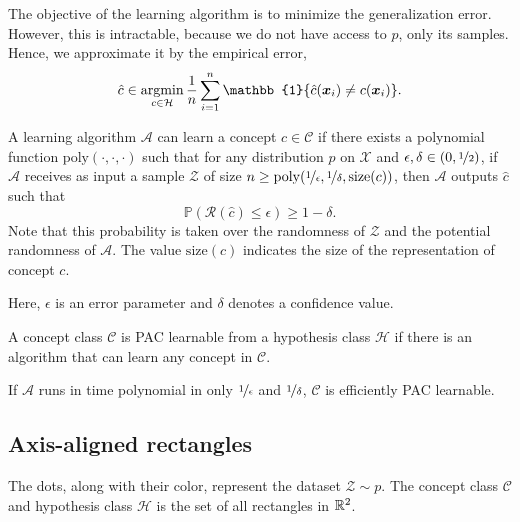 The objective of the learning algorithm is to minimize the generalization error. However, this is
intractable, because we do not have access to $p$, only its samples. Hence, we approximate it by
the empirical error, \[
    \hat{c} \in \argmin_{c \in \mathcal{H}} \frac{1}{n} \sum_{i=1}^{n} \mathbb{1}\{ \hat{c}(\vec{x}_i) \neq c(\vec{x}_i) \}.
\]

\begin{definition}[Learnable] \label{def:learnable}
    A learning algorithm $\mathcal{A}$ can learn a concept $c \in \mathcal{C}$ if there exists a
    polynomial function $\mathrm{poly}(\cdot, \cdot, \cdot)$ such that for any distribution $p$ on
    $\mathcal{X}$ and $\epsilon, \delta \in (0, \nicefrac{1}{2})$, if $\mathcal{A}$ receives as input
    a sample $\mathcal{Z}$ of size $n \geq \mathrm{poly}(\nicefrac{1}{\epsilon}, \nicefrac{1}{\delta},
        \mathrm{size}(c))$, then $\mathcal{A}$ outputs $\hat{c}$ such that \[
        \mathbb{P}(\mathcal{R}(\hat{c}) \leq \epsilon) \geq 1-\delta.
    \]
    Note that this probability is taken over the randomness of $\mathcal{Z}$ and the potential
    randomness of $\mathcal{A}$. The value $\mathrm{size}(c)$ indicates the size of the representation
    of concept $c$.
\end{definition}

Here, $\epsilon$ is an error parameter and $\delta$ denotes a confidence value.

\begin{definition}
    A concept class $\mathcal{C}$ is PAC learnable from a hypothesis class $\mathcal{H}$ if there is
    an algorithm that can learn any concept in $\mathcal{C}$.
\end{definition}

\begin{definition}
    If $\mathcal{A}$ runs in time polynomial in only $\nicefrac{1}{\epsilon}$ and
    $\nicefrac{1}{\delta}$, $\mathcal{C}$ is efficiently PAC learnable.
\end{definition}

\subsection{Axis-aligned rectangles}

\begin{marginfigure}[-10cm]
    \centering
    \caption{The dots, along with their color, represent the dataset $\mathcal{Z} \sim p$. The concept class $\mathcal{C}$ and
        hypothesis class $\mathcal{H}$ is the set of all rectangles in $\mathbb{R}^2$.}
    \label{fig:axis-aligned-rectangles}
\end{marginfigure}

